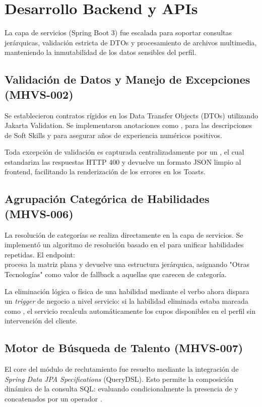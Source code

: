 \section{Desarrollo Backend y APIs}
\label{sec:backend_sprint2}

La capa de servicios (Spring Boot 3) fue escalada para soportar consultas jerárquicas, validación estricta de DTOs y procesamiento de archivos multimedia, manteniendo la inmutabilidad de los datos sensibles del perfil.

\subsection{Validación de Datos y Manejo de Excepciones (MHVS-002)}
Se establecieron contratos rígidos en los Data Transfer Objects (DTOs) utilizando Jakarta Validation. Se implementaron anotaciones como ,  para las descripciones de Soft Skills y  para asegurar años de experiencia numéricos positivos.

Toda excepción de validación es capturada centralizadamente por un , el cual estandariza las respuestas HTTP 400 y devuelve un formato JSON limpio al frontend, facilitando la renderización de los errores en los Toasts.

\subsection{Agrupación Categórica de Habilidades (MHVS-006)}
La resolución de categorías se realiza directamente en la capa de servicios. Se implementó un algoritmo de resolución basado en el  para unificar habilidades repetidas. El endpoint:\\  procesa la matriz plana y devuelve una estructura jerárquica, asignando "Otras Tecnologías" como valor de fallback a aquellas que carecen de categoría.

\begin{BreakingChange}
La eliminación lógica o física de una habilidad mediante el verbo  ahora dispara un \textit{trigger} de negocio a nivel servicio: si la habilidad eliminada estaba marcada como , el servicio recalcula automáticamente los cupos disponibles en el perfil sin intervención del cliente.
\end{BreakingChange}

\subsection{Motor de Búsqueda de Talento (MHVS-007)}
El core del módulo de reclutamiento fue resuelto mediante la integración de \textit{Spring Data JPA Specifications} (QueryDSL). Esto permite la composición dinámica de la consulta SQL: evaluando condicionalmente la presencia de  y  concatenados por un operador .

